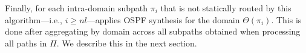 Finally, for each intra-domain subpath $\pi_i$ that is not statically routed by this algorithm---i.e., $i\geq nl$---\name applies
OSPF synthesis for the domain $\Theta(\pi_i)$. 
This is done after aggregating by domain across all subpaths obtained when processing all paths in $\Pi$.
We describe this in the next section.



%
%
